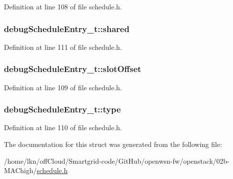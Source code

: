 Definition at line 108 of file schedule.\+h.

\subsubsection[{\texorpdfstring{shared}{shared}}]{ debug\+Schedule\+Entry\+\_\+t\+::shared}\hypertarget{structdebug_schedule_entry__t_abcb60365622ad596a849bb79ac909dad}{}\label{structdebug_schedule_entry__t_abcb60365622ad596a849bb79ac909dad}


Definition at line 111 of file schedule.\+h.

\subsubsection[{\texorpdfstring{slot\+Offset}{slotOffset}}]{ debug\+Schedule\+Entry\+\_\+t\+::slot\+Offset}\hypertarget{structdebug_schedule_entry__t_afb3995e0f8a314b53f45958c62256841}{}\label{structdebug_schedule_entry__t_afb3995e0f8a314b53f45958c62256841}


Definition at line 109 of file schedule.\+h.

\subsubsection[{\texorpdfstring{type}{type}}]{ debug\+Schedule\+Entry\+\_\+t\+::type}\hypertarget{structdebug_schedule_entry__t_ae9c3f17551ebf437fae27900b287591b}{}\label{structdebug_schedule_entry__t_ae9c3f17551ebf437fae27900b287591b}


Definition at line 110 of file schedule.\+h.



The documentation for this struct was generated from the following file\+:\begin{DoxyCompactItemize}
\item 
/home/lkn/off\+Cloud/\+Smartgrid-\/code/\+Git\+Hub/openwsn-\/fw/openstack/02b-\/\+M\+A\+Chigh/\hyperlink{schedule_8h}{schedule.\+h}\end{DoxyCompactItemize}
